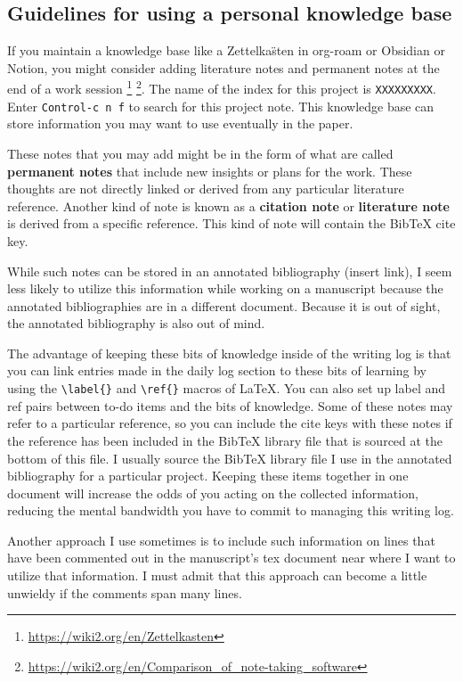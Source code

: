 \documentclass[10pt,letterpaper]{article}
\begin{document}
\subsection{Guidelines for using a personal knowledge base}
\label{subsec:guides:knowledgebase}

If you maintain a knowledge base like a Zettelka\"sten  in org-roam or Obsidian or Notion, you might consider adding literature notes and permanent notes at the end of a work session \footnote{\url{https://wiki2.org/en/Zettelkasten}} \footnote{\url{https://wiki2.org/en/Comparison_of_note-taking_software}}.
The name of the index for this project is \verb|XXXXXXXXX|.
Enter \texttt{Control-c n f} to search for this project note.
This knowledge base can store information you may want to use eventually in the paper.

These notes that you may add might be in the form of what are called \textbf{permanent notes} that include new insights or plans for the work.
These thoughts are not directly linked or derived from any particular literature reference.
Another kind of note is known as a \textbf{citation note} or \textbf{literature note} is derived from a specific reference.
This kind of note will contain the BibTeX cite key.

While such notes can be stored in an annotated bibliography (insert link), I seem less likely to utilize this information while working on a manuscript because the annotated bibliographies are in a different document.
Because it is out of sight, the annotated bibliography is also out of mind.

The advantage of keeping these bits of knowledge inside of the writing log is that you can link entries made in the daily log section to these bits of learning by using the \verb|\label{}| and \verb|\ref{}| macros of \LaTeX.
You can also set up label and ref pairs between to-do items and the bits of knowledge.
Some of these notes may refer to a particular reference, so you can include the cite keys with these notes if the reference has been included in the BibTeX library file that is sourced at the bottom of this file.
I usually source the BibTeX library file I use in the annotated bibliography for a particular project.
Keeping these items together in one document will increase the odds of you acting on the collected information, reducing the mental bandwidth you have to commit to managing this writing log.

Another approach I use sometimes is to include such information on lines that have been commented out in the manuscript's tex document near where I want to utilize that information.
I must admit that this approach can become a little unwieldy if the comments span many lines.
\end{document}
